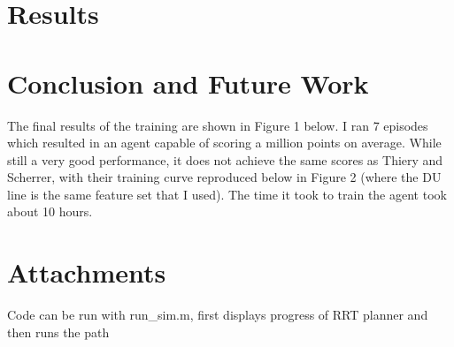 \documentclass[a4paper, 11pt]{article}
\begin{document}
\section{Results}




\section{Conclusion and Future Work}
The final results of the training are shown in Figure 1 below. I ran 7 episodes which resulted in an agent capable of scoring a million points on average. While still a very good performance, it does not achieve the same scores as Thiery and Scherrer, with their training curve reproduced below in Figure 2 (where the DU line is the same feature set that I used). The time it took to train the agent took about 10 hours.




\section*{Attachments}
Code can be run with run\_sim.m, first displays progress of RRT planner and then runs the path



\end{document}
